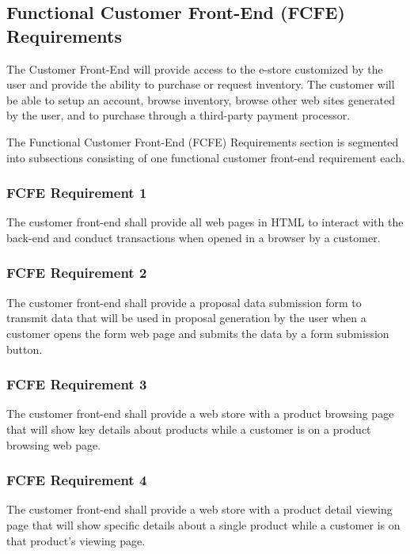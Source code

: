 \documentclass{article}
\begin{document}
\pagebreak
\subsection{Functional Customer Front-End (FCFE) Requirements}

The Customer Front-End will provide access to the e-store customized by the user
and provide the ability to purchase or request inventory.  The customer will
be able to setup an account, browse inventory, browse other web sites generated
by the user, and to purchase through a third-party payment processor.

The Functional Customer Front-End (FCFE) Requirements section is segmented into
subsections consisting of one functional customer front-end requirement each.

\subsubsection{FCFE Requirement 1}
\label{func-cust-front-end-1}

The customer front-end shall provide all web pages in HTML to interact with the
back-end and conduct transactions when opened in a browser by a customer.

\subsubsection{FCFE Requirement 2}
\label{func-cust-front-end-2}

The customer front-end shall provide a proposal data submission form to transmit
data that will be used in proposal generation by the user when a customer
opens the form web page and submits the data by a form submission button.

\subsubsection{FCFE Requirement 3}
\label{func-cust-front-end-3}

The customer front-end shall provide a web store with a product browsing page
that will show key details about products while a customer is on a product
browsing web page.

\subsubsection{FCFE Requirement 4}
\label{func-cust-front-end-4}

The customer front-end shall provide a web store with a product detail viewing
page that will show specific details about a single product while a customer is
on that product's viewing page.
\end{document}
